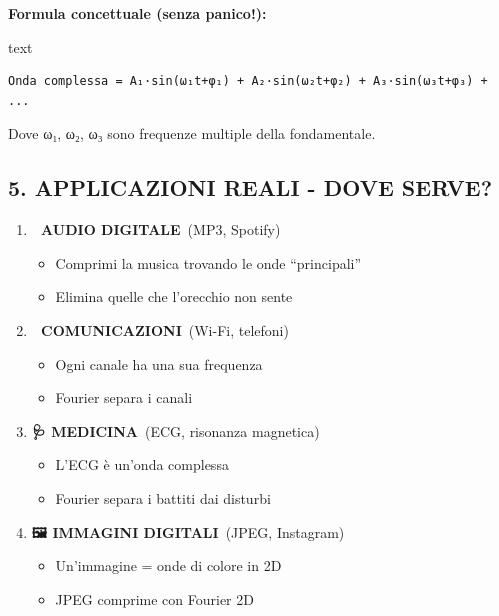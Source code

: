 \documentclass[
]{article}
\providecommand{\tightlist}{%
  \setlength{\itemsep}{0pt}\setlength{\parskip}{0pt}}
\begin{document}
\textbf{Formula concettuale (senza panico!):}

text

\begin{verbatim}
Onda complessa = A₁·sin(ω₁t+φ₁) + A₂·sin(ω₂t+φ₂) + A₃·sin(ω₃t+φ₃) + ...
\end{verbatim}

Dove ω₁, ω₂, ω₃ sono frequenze multiple della fondamentale.

\hypertarget{applicazioni-reali---dove-serve}{%
\subsection{\texorpdfstring{\textbf{5. APPLICAZIONI REALI - DOVE SERVE?}}{5. APPLICAZIONI REALI - DOVE SERVE?}}\label{applicazioni-reali---dove-serve}}

\begin{enumerate}
\def\labelenumi{\arabic{enumi}.}
\tightlist
\item
  \textbf{🎵 AUDIO DIGITALE}~(MP3, Spotify)

  \begin{itemize}
  \tightlist
  \item
    Comprimi la musica trovando le onde ``principali''
  \item
    Elimina quelle che l'orecchio non sente
  \end{itemize}
\item
  \textbf{📡 COMUNICAZIONI}~(Wi-Fi, telefoni)

  \begin{itemize}
  \tightlist
  \item
    Ogni canale ha una sua frequenza
  \item
    Fourier separa i canali
  \end{itemize}
\item
  \textbf{🩺 MEDICINA}~(ECG, risonanza magnetica)

  \begin{itemize}
  \tightlist
  \item
    L'ECG è un'onda complessa
  \item
    Fourier separa i battiti dai disturbi
  \end{itemize}
\item
  \textbf{🖼️ IMMAGINI DIGITALI}~(JPEG, Instagram)

  \begin{itemize}
  \tightlist
  \item
    Un'immagine = onde di colore in 2D
  \item
    JPEG comprime con Fourier 2D
  \end{itemize}
\end{enumerate}
\end{document}
